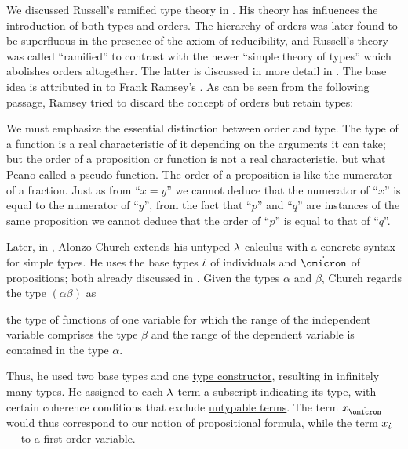 \begin{remark}\label{rem:type_theory}
  We discussed Russell's ramified type theory in . His theory has influences the introduction of both types and orders. The hierarchy of orders was later found to be superfluous in the presence of the axiom of reducibility, and Russell's theory was called \enquote{ramified} to contrast with the newer \enquote{simple theory of types} which abolishes orders altogether. The latter is discussed in more detail in . The base idea is attributed in \cite[45]{Kleene1971Metamathematics} to Frank Ramsey's \cite{Ramsey1926Foundations}. As can be seen from the following passage, Ramsey tried to discard the concept of orders but retain types:
  \begin{displayquote}
    We must emphasize the essential distinction between order and type. The type of a function is a real characteristic of it depending on the
    arguments it can take; but the order of a proposition or function is not a real characteristic, but what Peano called a pseudo-function. The
    order of a proposition is like the numerator of a fraction. Just as from \enquote{\( x = y \)} we cannot deduce that the numerator of \enquote{\( x \)} is equal to the numerator of \enquote{\( y \)}, from the fact that \enquote{\( p \)} and \enquote{\( q \)} are instances of the
    same proposition we cannot deduce that the order of \enquote{\( p \)} is equal to that of \enquote{\( q \)}.
  \end{displayquote}

  Later, in \cite{Church1940STT}, Alonzo Church extends his untyped \( {\mathrm \lambda} \)-calculus with a concrete syntax for simple types. He uses the base types \( \dot{\iota} \) of individuals and \( \syn\omicron \) of propositions; both already discussed in . Given the types \( \alpha \) and \( \beta \), Church regards the type \( (\alpha\beta) \) as
  \begin{displayquote}
    \textellipsis the type of functions of one variable for which the range of the independent variable comprises the type \( \beta \) and the range of the dependent variable is contained in the type \( \alpha \).
  \end{displayquote}

  Thus, he used two base types and one \hyperref[con:type_constructor]{type constructor}, resulting in infinitely many types. He assigned to each \( {\mathrm \lambda} \)-term a subscript indicating its type, with certain coherence conditions that exclude \hyperref[def:typability]{untypable terms}. The term \( x_{\syn\omicron} \) would thus correspond to our notion of propositional formula, while the term \( x_{\dot{\iota}} \) --- to a first-order variable.


\end{remark}
